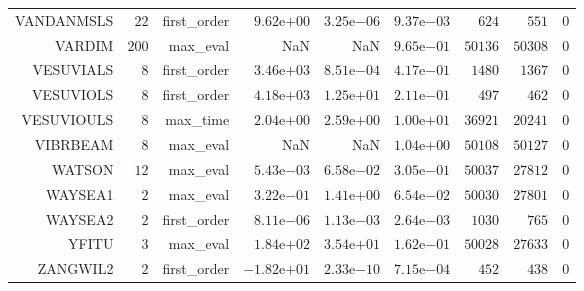 \begin{longtable}{rrrrrrrrr}
VANDANMSLS & \(    22\) & first\_order & \( 9.62\)e\(+00\) & \( 3.25\)e\(-06\) & \( 9.37\)e\(-03\) & \(   624\) & \(   551\) & \(     0\) \\
VARDIM & \(   200\) & max\_eval &       NaN &       NaN & \( 9.65\)e\(-01\) & \( 50136\) & \( 50308\) & \(     0\) \\
VESUVIALS & \(     8\) & first\_order & \( 3.46\)e\(+03\) & \( 8.51\)e\(-04\) & \( 4.17\)e\(-01\) & \(  1480\) & \(  1367\) & \(     0\) \\
VESUVIOLS & \(     8\) & first\_order & \( 4.18\)e\(+03\) & \( 1.25\)e\(+01\) & \( 2.11\)e\(-01\) & \(   497\) & \(   462\) & \(     0\) \\
VESUVIOULS & \(     8\) & max\_time & \( 2.04\)e\(+00\) & \( 2.59\)e\(+00\) & \( 1.00\)e\(+01\) & \( 36921\) & \( 20241\) & \(     0\) \\
VIBRBEAM & \(     8\) & max\_eval &       NaN &       NaN & \( 1.04\)e\(+00\) & \( 50108\) & \( 50127\) & \(     0\) \\
WATSON & \(    12\) & max\_eval & \( 5.43\)e\(-03\) & \( 6.58\)e\(-02\) & \( 3.05\)e\(-01\) & \( 50037\) & \( 27812\) & \(     0\) \\
WAYSEA1 & \(     2\) & max\_eval & \( 3.22\)e\(-01\) & \( 1.41\)e\(+00\) & \( 6.54\)e\(-02\) & \( 50030\) & \( 27801\) & \(     0\) \\
WAYSEA2 & \(     2\) & first\_order & \( 8.11\)e\(-06\) & \( 1.13\)e\(-03\) & \( 2.64\)e\(-03\) & \(  1030\) & \(   765\) & \(     0\) \\
YFITU & \(     3\) & max\_eval & \( 1.84\)e\(+02\) & \( 3.54\)e\(+01\) & \( 1.62\)e\(-01\) & \( 50028\) & \( 27633\) & \(     0\) \\
ZANGWIL2 & \(     2\) & first\_order & \(-1.82\)e\(+01\) & \( 2.33\)e\(-10\) & \( 7.15\)e\(-04\) & \(   452\) & \(   438\) & \(     0\) \\\hline
\end{longtable}
